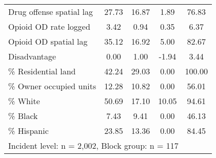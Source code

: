 \begin{table}[htbp]
\begin{tabular}{l*{1}{cccc}}
Drug offense spatial lag&    27.73&    16.87&     1.89&    76.83\\
Opioid OD rate logged&     3.42&     0.94&     0.35&     6.37\\
Opioid OD spatial lag&    35.12&    16.92&     5.00&    82.67\\
Disadvantage&     0.00&     1.00&    -1.94&     3.44\\
\% Residential land&    42.24&    29.03&     0.00&   100.00\\
\% Owner occupied units&    12.28&    10.82&     0.00&    56.01\\
\% White        &    50.69&    17.10&    10.05&    94.61\\
\% Black        &     7.43&     9.41&     0.00&    46.13\\
\% Hispanic     &    23.85&    13.36&     0.00&    84.45\\
\bottomrule
\multicolumn{5}{l}{\footnotesize Incident level: n = 2,002, Block group: n = 117}\\
\end{tabular}
\end{table}
